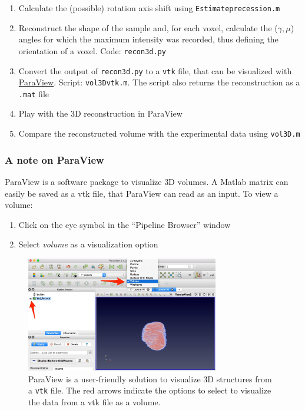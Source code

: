 \documentclass[11pt]{scrartcl}
\begin{document}
\begin{enumerate}
    \item Calculate the (possible) rotation axis shift using {\texttt{Estimate\textunderscore precession.m}}
    \item Reconstruct the shape of the sample and, for each voxel, calculate the ($\gamma, \mu$) angles for which the maximum intensity was recorded, thus defining the orientation of a voxel. Code: {\texttt{recon3d.py}}
    \item Convert the output of {\texttt{recon3d.py}} to a {\texttt{vtk}} file, that can be visualized with \href{https://www.paraview.org/}{ParaView}. Script: {\texttt{vol3D\textunderscore vtk.m}}. The script also returns the reconstruction as a {\texttt{.mat}} file
    \item Play with the {\footnotesize{3D}} reconstruction in ParaView
    \item Compare the reconstructed volume with the experimental data using {\texttt{vol3D.m}}
\end{enumerate}

\subsubsection{A note on ParaView}

ParaView is a software package to visualize {\footnotesize{3D}} volumes. A Matlab matrix can easily be saved as a vtk file, that ParaView can read as an input. To view a volume:

\begin{enumerate}
    \item Click on the eye symbol in the ``Pipeline Browser'' window
    \item Select {\emph{volume}} as a visualization option 
\end{enumerate}

\begin{figure}[h]
    \centering
    \includegraphics[width=0.75\textwidth]{Paraview_manual.png}
    \caption{ParaView is a user-friendly solution to visualize {\footnotesize{3D}} structures from a {\texttt{vtk}} file. The red arrows indicate the options to select to visualize the data from a vtk file as a volume.}
    \label{fig:my_label}
\end{figure}
\end{document}
